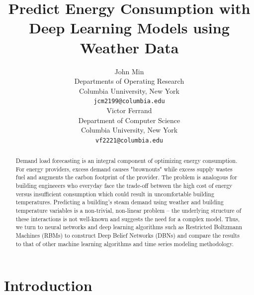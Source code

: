 \documentclass{article} %
\title{Predict Energy Consumption with Deep Learning Models using Weather Data}
\author{
John Min\\
Departments of Operating Research\\
Columbia Unniversity, New  York\\
\texttt{jcm2199@columbia.edu} \\
\And
Victor Ferrand\\
Department of Computer Science \\
Columbia University, New York\\
\texttt{vf2221@columbia.edu} 
}
\begin{document}
\maketitle

\begin{abstract}
Demand load forecasting is an integral component of optimizing energy consumption. For energy providers, excess demand causes "brownouts" while excess supply wastes fuel and augments the carbon footprint of the provider. The problem is analogous for building engineeers who everyday face the trade-off between the high cost of energy versus insufficient consumption which could result in uncomfortable building temperatures. Predicting a building's steam demand using weather and building temperature variables is a non-trivial, non-linear problem -- the underlying structure of these interactions is not well-known and suggests the need for a complex model.  Thus, we turn to neural networks and deep learning algorithms such as Restricted Boltzmann Machines (RBMs) to construct Deep Belief Networks (DBNs) and compare the results to that of other machine learning algorithms and time series modeling methodology. 

\end{abstract}

\vspace{-.2cm}
\section{Introduction}
\vspace{-.2cm}
\end{document}

